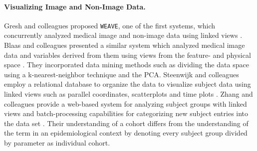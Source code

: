 \documentclass[journal]{style/vgtc} 			          %
\begin{document}
\paragraph{Visualizing Image and Non-Image Data. }
Gresh and colleagues proposed \texttt{WEAVE}, one of the first systems, which concurrently analyzed medical image and non-image data using linked views \cite{Gresh2000}.
%
Blaas and colleagues presented a similar system which analyzed medical image data and variables derived from them using views from the feature- and physical space \cite{Blaas2007}.
%
They incorporated data mining methods such as dividing the data space using a k-nearest-neighbor technique and the PCA.
%
Steenwijk and colleagues employ a relational database to organize the data to visualize subject data using linked views such as parallel coordinates, scatterplots and time plots \cite{Steenwijk2010}.
%
Zhang and colleagues provide a web-based system for analyzing subject groups with linked views and batch-processing capabilities for categorizing new subject entries into the data set \cite{Zhang2012}.
%
Their understanding of a cohort differs from the understanding of the term in an epidemiological context by denoting every subject group divided by parameter as individual cohort.
\end{document}
